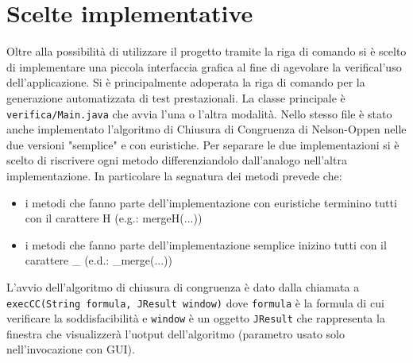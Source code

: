 \documentclass[a4paper,11pt]{article}
\begin{document}
\section{Scelte implementative}
Oltre alla possibilità di utilizzare il progetto tramite la riga di comando si è scelto di implementare una piccola interfaccia grafica al fine di agevolare la verifical'uso dell'applicazione.
Si è principalmente adoperata la riga di comando per la generazione automatizzata di test prestazionali.
La classe principale è {\tt verifica/Main.java} che avvia l'una o l'altra modalità.
Nello stesso file è stato anche implementato l'algoritmo di Chiusura di Congruenza di Nelson-Oppen nelle due versioni "semplice" e con euristiche.
Per separare le due implementazioni si è scelto di riscrivere ogni metodo differenziandolo dall'analogo nell'altra implementazione.
In particolare la segnatura dei metodi prevede che:
\begin{itemize}
	\item i metodi che fanno parte dell'implementazione con euristiche terminino tutti con il carattere H (e.g.: mergeH(...))
	\item i metodi che fanno parte dell'implementazione semplice inizino tutti con il carattere \_ (e.d.: \_merge(...))
\end{itemize}
L'avvio dell'algoritmo di chiusura di congruenza è dato dalla chiamata a  
{\tt execCC(String formula, JResult window)}
dove {\tt formula} è la formula di cui verificare la soddisfacibilità e {\tt window} è un oggetto {\tt JResult} che rappresenta la finestra che visualizzerà l'uotput dell'algoritmo (parametro usato solo nell'invocazione con GUI).
\end{document}
